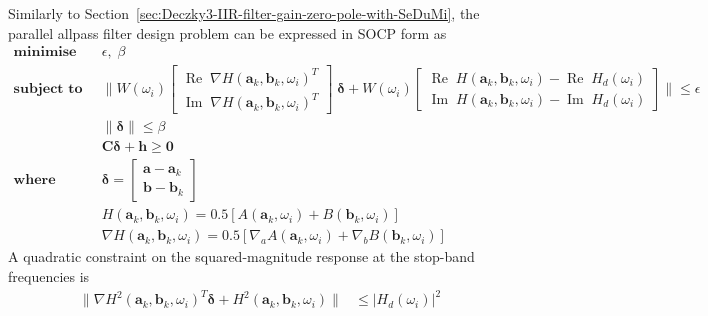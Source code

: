 \documentclass[a4paper,twoside,10pt,english]{report}
\begin{document}
Similarly to Section~\ref{sec:Deczky3-IIR-filter-gain-zero-pole-with-SeDuMi},
the parallel allpass filter design problem can be expressed in SOCP form as
\begin{align*}
\textbf{minimise}  \quad&\epsilon ,\;\beta\\
\textbf{subject to}\quad&
\|W\left(\omega_{i}\right)\left[\begin{array}{c}
\operatorname{Re}\;\nabla 
H\left(\boldsymbol{a}_{k},\boldsymbol{b}_{k},\omega_{i}\right)^{T}\\
\operatorname{Im}\;\nabla 
H\left(\boldsymbol{a}_{k},\boldsymbol{b}_{k},\omega_{i}\right)^{T}
\end{array}\right]\;\boldsymbol{\delta} + 
W\left(\omega_{i}\right)\left[\begin{array}{c}
\operatorname{Re}\;H\left(\boldsymbol{a}_{k},\boldsymbol{b}_{k},\omega_{i}\right)-
\operatorname{Re}\;H_{d}\left(\omega_{i}\right)\\
\operatorname{Im}\;H\left(\boldsymbol{a}_{k},\boldsymbol{b}_{k},\omega_{i}\right)-
\operatorname{Im}\;H_{d}\left(\omega_{i}\right)
\end{array}\right]\|\le\epsilon\nonumber\\
&\|\boldsymbol{\delta}\|\le\beta
\nonumber\\
&\boldsymbol{C}\boldsymbol{\delta}+\boldsymbol{h} \ge \boldsymbol{0}\nonumber\\
\textbf{where}\quad&
\boldsymbol{\delta}=\left[\begin{array}{c}
\boldsymbol{a} - \boldsymbol{a}_{k}\\ 
\boldsymbol{b} - \boldsymbol{b}_{k}
\end{array}\right]\\
&H\left(\boldsymbol{a}_{k},\boldsymbol{b}_{k},\omega_{i}\right) =
0.5\left[A\left(\boldsymbol{a}_{k},\omega_{i}\right) +
B\left(\boldsymbol{b}_{k},\omega_{i}\right)\right]\\
&\nabla H\left(\boldsymbol{a}_{k},\boldsymbol{b}_{k},\omega_{i}\right)=
0.5\left[\nabla_{a} A\left(\boldsymbol{a}_{k},\omega_{i}\right)+
\nabla_{b} B\left(\boldsymbol{b}_{k},\omega_{i}\right)\right]
\end{align*}
A quadratic constraint on the squared-magnitude response at the stop-band
frequencies is
\begin{align*}
\|\nabla H^{2}\left( \boldsymbol{a}_{k},\boldsymbol{b}_{k},\omega_{i}\right)^{T}
\boldsymbol{\delta} + 
H^{2}\left( \boldsymbol{a}_{k},\boldsymbol{b}_{k}, \omega_{i} \right) \| & 
\le \left|H_{d}\left(\omega_{i}\right)\right|^{2}
\end{align*}
\end{document}
